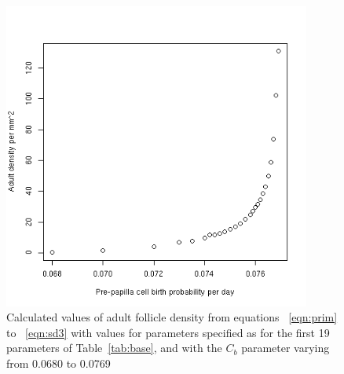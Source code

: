 %

\begin{figure}[!h]
  \centering
   \includegraphics[width=0.9\textwidth]{cbprobfn.png}
  \caption{Calculated values of adult follicle density from equations ~\ref{eqn:prim} to ~\ref{eqn:sd3} with values for parameters specified as for the first 19 parameters of Table~\ref{tab:base}, and with the $C_{b}$ parameter varying from 0.0680 to 0.0769}
  \label{fig:cbprobfn}
\end{figure}

%

